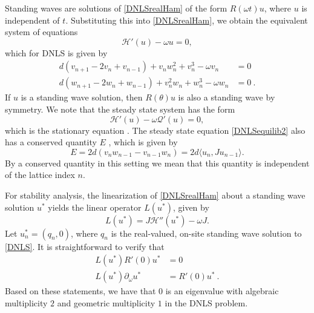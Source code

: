 \documentclass[12pt]{elsarticle}
\begin{document}
Standing waves are solutions of \cref{DNLSrealHam} of the form $R(\omega t) u$, where $u$ is independent of $t$. Substituting this into \cref{DNLSrealHam}, we obtain the equivalent system of equations
\begin{equation}\label{DNLSequilib1}
\mathcal{H}'(u) - \omega u = 0,
\end{equation}
which for DNLS is given by
\begin{equation}\label{DNLSequilib2}
\begin{aligned}
d (v_{n+1} - 2 v_n + v_{n-1}) + v_n w_n^2 + v_n^3 - \omega v_n &= 0 \\
d (w_{n+1} - 2 w_n + w_{n-1}) + v_n^2 w_n + w_n^3 - \omega w_n &= 0 \:.
\end{aligned} 
\end{equation}
If $u$ is a standing wave solution, then $R(\theta) u$ is also a standing wave by symmetry. We note that the steady state system has the form
\begin{equation}
\mathcal{H}'(u) - \omega \mathcal{Q}'(u) = 0,
\end{equation}
which is the stationary equation \cite[(2.15)]{Grillakis1987}. The steady state equation \cref{DNLSequilib2} also has a conserved quantity $E$ \cite{Johansson2000}, which is given by
\begin{equation}\label{DNLSE}
E = 2d(v_n w_{n-1} - v_{n-1} w_n) = 2d \langle u_n, J u_{n-1} \rangle.
\end{equation}
By a conserved quantity in this setting we mean
that this quantity is independent of the lattice
index $n$.

For stability analysis, the linearization of \cref{DNLSrealHam} about a standing wave solution $u^*$ 
yields the linear operator $L(u^*)$, given by 
\begin{equation}\label{DNLSeigproblem}
L(u^*) = J \mathcal{H}''(u^*)  - \omega J.
\end{equation}
Let $u^*_n = (q_n, 0)$, where $q_n$ is the real-valued, on-site standing wave solution to \cref{DNLS}. It is straightforward to verify that
\begin{equation}\label{DNLSkernel1}
\begin{aligned}
L(u^*) R'(0) u^* &= 0 \\
L(u^*) \partial_\omega u^* &= R'(0) u^* \:.
\end{aligned}
\end{equation}
Based on these statements, we have that $0$ is an
eigenvalue with algebraic multiplicity $2$ and
geometric multiplicity $1$ in the DNLS problem. 
\end{document}
